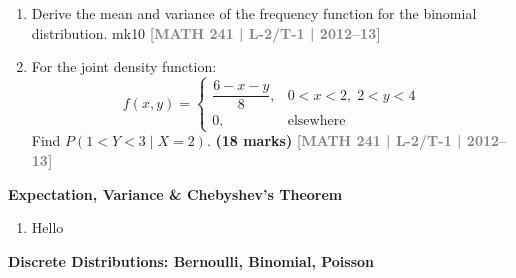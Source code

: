 \documentclass[12pt,a4paper]{article}
\newcommand{\yr}[1]{\hfill\textcolor{gray}{\small\textbf{[#1]}}}
\newcommand{\mk}[1]{\textcolor{orange!70!black}{\small\textbf{(#1 marks)}}}
\newcommand{\subtopic}[2]{%
  \vspace{10pt}
  \noindent\begin{tcolorbox}[colback=#1!8,colframe=#1,boxrule=0.6pt,arc=4pt,
    left=6pt,right=6pt,top=4pt,bottom=4pt]
    \small\bfseries\textcolor{#1}{#2}
  \end{tcolorbox}
  \vspace{2pt}
}
\begin{document}
\begin{enumerate}
\item Derive the mean and variance of the frequency function for the binomial distribution.
mk{10} \yr{MATH 241 | L-2/T-1 | 2012--13}

\item For the joint density function:
\[
f(x,y) = \begin{cases} \dfrac{6-x-y}{8}, & 0<x<2,\; 2<y<4 \\ 0, & \text{elsewhere} \end{cases}
\]
Find $P(1<Y<3\mid X=2)$.
\mk{18} \yr{MATH 241 | L-2/T-1 | 2012--13}

\end{enumerate}

\subtopic{cG}{Expectation, Variance \& Chebyshev's Theorem}

\label{sub:s8-expect}

\begin{enumerate}\item Hello \end{enumerate}

\subtopic{cG}{Discrete Distributions: Bernoulli, Binomial, Poisson}
\label{sub:s8-discrete}
\end{document}
